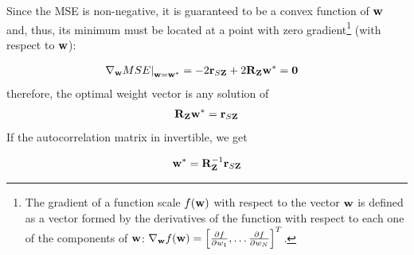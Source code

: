 Since the MSE is non-negative, it is guaranteed to be a convex function of ${\bf w}$ and, thus, its minimum must be located at a point with zero gradient\footnote{The gradient of a function scale $f({\bf w})$ with respect to the vector ${\bf w}$ is defined as a vector formed by the derivatives of the function with respect to each one of the components of $\bf w$: $\nabla_{{\bf w}} f({\bf w}) = \left[\frac{\partial f}{\partial w_1}, \dots \frac{\partial f}{\partial w_N}\right]^T$.} (with respect to ${\bf w}$):
{\begin{align}
\label{ec:ecs_normales_1}
\left. \nabla_{\bf w} MSE \right|_{{\bf w} = {\bf w}^*} 
 &= -2 {\bf r}_{S{\bf Z}} + 2 {\bf R}_{\bf Z} {\bf w}^* 
  = {\bf 0}
\end{align}
%
%
therefore, the optimal weight vector is any solution of
\begin{align}
\label{ec:ecs_normales_2}
{\bf R}_{\bf Z} {\bf w}^* = {\bf r}_{S{\bf Z}}
\end{align}
If the autocorrelation matrix in invertible, we get
\begin{framed}
\begin{equation}
\label{Est.ec:weopt}
 {\bf w}^* = {{\bf R}_{\bf Z}^{-1}} {\bf r}_{S{\bf Z}} 
\end{equation}
\end{framed}}

